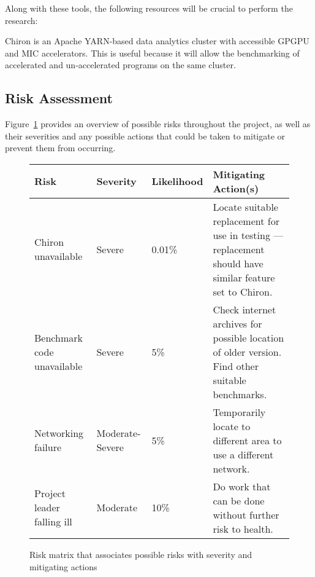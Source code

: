 \documentclass[12pt,a4paper]{article}
\begin{document}
			Along with these tools, the following resources will be crucial to perform the research:

			\begin{description}[style=nextline]
				\item[\textbf{Chiron}] Chiron is an Apache YARN-based data analytics cluster with accessible GPGPU and MIC accelerators. This is useful because it will allow the benchmarking of accelerated and un-accelerated programs on the same cluster.
			\end{description}


		\subsection{Risk Assessment} %
		\label{sub:risk_assessment}

			Figure~\ref{fig:risk_matrix} provides an overview of possible risks throughout the project, as well as their severities and any possible actions that could be taken to mitigate or prevent them from occurring.

			\begin{figure}
				\begin{center}
					\begin{tabular}{| p{3cm} | l | l | p{4cm} |}
						\hline
						Risk & Severity & Likelihood & Mitigating Action(s) \\ \hline
						Chiron unavailable & \cellcolor{red!15} Severe & \cellcolor{green!25} 0.01\% & Locate suitable replacement for use in testing --- replacement should have similar feature set to Chiron. \\ \hline
						Benchmark code unavailable & \cellcolor{red!15} Severe & \cellcolor{yellow!15} 5\% & Check internet archives for possible location of older version. Find other suitable benchmarks. \\ \hline
						Networking failure & \cellcolor{orange!15} Moderate-Severe & \cellcolor{yellow!15} 5\% & Temporarily locate to different area to use a different network. \\ \hline
						Project leader falling ill & \cellcolor{yellow!15} Moderate & \cellcolor{orange!15} 10\% & Do work that can be done without further risk to health. \\ \hline
					\end{tabular}
				\end{center}

				\caption{Risk matrix that associates possible risks with severity and mitigating actions}
				\label{fig:risk_matrix}
			\end{figure}
		
\end{document}
